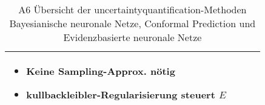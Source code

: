 \begin{otherlanguage}{ngerman}
\begin{table}[!htpb]
\begin{tabularx}{\textwidth}{|>{\centering\arraybackslash}l|X|X|X|}
    \begin{minipage}[t]{\linewidth}
    \vspace{0.3em}
    \begin{itemize}[leftmargin=*, label={}, itemsep=0.125em, topsep=0em, parsep=0em]
        \item Keine Sampling-Approx. nötig
        \item \gls{kullbackleibler}-Regularisierung steuert \( E \)
    \end{itemize}
    \vspace{0.3em}
    \end{minipage} \\
    \hline

  \end{tabularx}
  \caption{A6 Übersicht der \gls{uncertaintyquantification}-Methoden \gls{Bayesianische neuronale Netze}, \gls{Conformal Prediction} und \gls{Evidenzbasierte neuronale Netze}}
  \label{tab:chapter6r91_clean}
\end{table}




\newline 


\end{otherlanguage}
